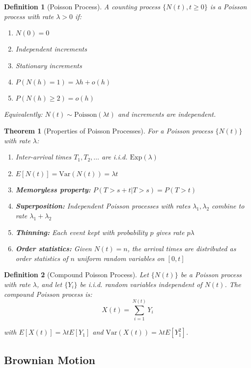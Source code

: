 \documentclass[12pt,a4paper]{article}
\newtheorem{theorem}{Theorem}[section]
\newtheorem{definition}{Definition}[section]
\theoremstyle{remark}
\begin{document}
\begin{definition}[Poisson Process]
A counting process $\{N(t), t \geq 0\}$ is a Poisson process with rate $\lambda > 0$ if:
\begin{enumerate}
\item $N(0) = 0$
\item Independent increments
\item Stationary increments
\item $P(N(h) = 1) = \lambda h + o(h)$
\item $P(N(h) \geq 2) = o(h)$
\end{enumerate}

Equivalently: $N(t) \sim \text{Poisson}(\lambda t)$ and increments are independent.
\end{definition}

\begin{theorem}[Properties of Poisson Processes]
For a Poisson process $\{N(t)\}$ with rate $\lambda$:
\begin{enumerate}
\item Inter-arrival times $T_1, T_2, \ldots$ are i.i.d. $\text{Exp}(\lambda)$
\item $E[N(t)] = \text{Var}(N(t)) = \lambda t$
\item \textbf{Memoryless property:} $P(T > s+t | T > s) = P(T > t)$
\item \textbf{Superposition:} Independent Poisson processes with rates $\lambda_1, \lambda_2$ combine to rate $\lambda_1 + \lambda_2$
\item \textbf{Thinning:} Each event kept with probability $p$ gives rate $p\lambda$
\item \textbf{Order statistics:} Given $N(t) = n$, the arrival times are distributed as order statistics of $n$ uniform random variables on $[0,t]$
\end{enumerate}
\end{theorem}

\begin{definition}[Compound Poisson Process]
Let $\{N(t)\}$ be a Poisson process with rate $\lambda$, and let $\{Y_i\}$ be i.i.d. random variables independent of $N(t)$. The compound Poisson process is:
$$X(t) = \sum_{i=1}^{N(t)} Y_i$$

with $E[X(t)] = \lambda t E[Y_1]$ and $\text{Var}(X(t)) = \lambda t E[Y_1^2]$.
\end{definition}

\subsection{Brownian Motion}
\end{document}

